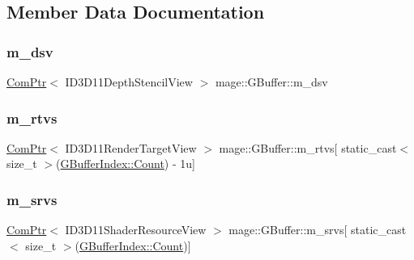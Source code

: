 \subsection{Member Data Documentation}
\hypertarget{structmage_1_1_g_buffer_a75ef598ba704be52788b7d6c9efe26e7}{}\label{structmage_1_1_g_buffer_a75ef598ba704be52788b7d6c9efe26e7} 
\subsubsection{\texorpdfstring{m\+\_\+dsv}{m\_dsv}}
{\footnotesize\ttfamily \hyperlink{namespacemage_ae74f374780900893caa5555d1031fd79}{Com\+Ptr}$<$ I\+D3\+D11\+Depth\+Stencil\+View $>$ mage\+::\+G\+Buffer\+::m\+\_\+dsv\hspace{0.3cm}{\ttfamily [private]}}

\hypertarget{structmage_1_1_g_buffer_a323230c320cc2de8ec9e2fb7aea45e92}{}\label{structmage_1_1_g_buffer_a323230c320cc2de8ec9e2fb7aea45e92} 
\subsubsection{\texorpdfstring{m\+\_\+rtvs}{m\_rtvs}}
{\footnotesize\ttfamily \hyperlink{namespacemage_ae74f374780900893caa5555d1031fd79}{Com\+Ptr}$<$ I\+D3\+D11\+Render\+Target\+View $>$ mage\+::\+G\+Buffer\+::m\+\_\+rtvs\mbox{[} static\+\_\+cast$<$ size\+\_\+t $>$(\hyperlink{structmage_1_1_g_buffer_a72f0fc0f46052fdc9872c48c57894607ae93f994f01c537c4e2f7d8528c3eb5e9}{G\+Buffer\+Index\+::\+Count}) -\/ 1u\mbox{]}\hspace{0.3cm}{\ttfamily [private]}}

\hypertarget{structmage_1_1_g_buffer_aec49b46758c36b8963a53e709a89bb0e}{}\label{structmage_1_1_g_buffer_aec49b46758c36b8963a53e709a89bb0e} 
\subsubsection{\texorpdfstring{m\+\_\+srvs}{m\_srvs}}
{\footnotesize\ttfamily \hyperlink{namespacemage_ae74f374780900893caa5555d1031fd79}{Com\+Ptr}$<$ I\+D3\+D11\+Shader\+Resource\+View $>$ mage\+::\+G\+Buffer\+::m\+\_\+srvs\mbox{[} static\+\_\+cast$<$ size\+\_\+t $>$(\hyperlink{structmage_1_1_g_buffer_a72f0fc0f46052fdc9872c48c57894607ae93f994f01c537c4e2f7d8528c3eb5e9}{G\+Buffer\+Index\+::\+Count})\mbox{]}\hspace{0.3cm}{\ttfamily [private]}}

